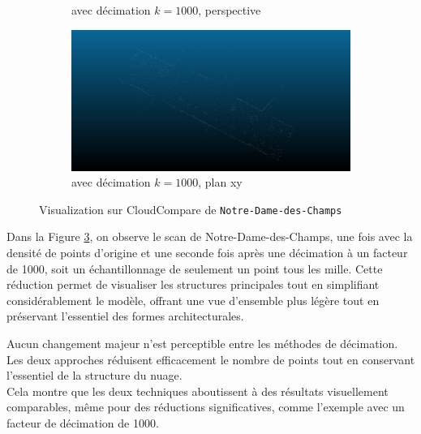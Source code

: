 \documentclass[../5RO17_TP4.tex]{subfiles}
\begin{document}
\begin{figure}[H]
\begin{subfigure}[b]{0.475\textwidth}
        \caption{avec décimation $k = 1000$, perspective}
        \label{}
    \end{subfigure}\hfill
    \begin{subfigure}[b]{0.475\textwidth}
        \centering
        \includegraphics[width=\linewidth]{images/ndc_1000_8.png}
        \caption{avec décimation $k = 1000$, plan xy}
        \label{}
    \end{subfigure}
    \caption{Visualization sur CloudCompare de \texttt{Notre-Dame-des-Champs}}
    \label{fig:decimation_ndc}
\end{figure}
\noindent Dans la Figure \ref{fig:decimation_ndc}, on observe le scan de Notre-Dame-des-Champs, une fois avec la densité de points d'origine et une seconde fois après une décimation à un facteur de 1000, soit un échantillonnage de seulement un point tous les mille. Cette réduction permet de visualiser les structures principales tout en simplifiant considérablement le modèle, offrant une vue d’ensemble plus légère tout en préservant l’essentiel des formes architecturales.

\begin{remark}
    Aucun changement majeur n'est perceptible entre les méthodes de décimation. Les deux approches réduisent efficacement le nombre de points tout en conservant l'essentiel de la structure du nuage.\\
    
    \noindent Cela montre que les deux techniques aboutissent à des résultats visuellement comparables, même pour des réductions significatives, comme l'exemple avec un facteur de décimation de 1000.
\end{remark}
\end{document}
